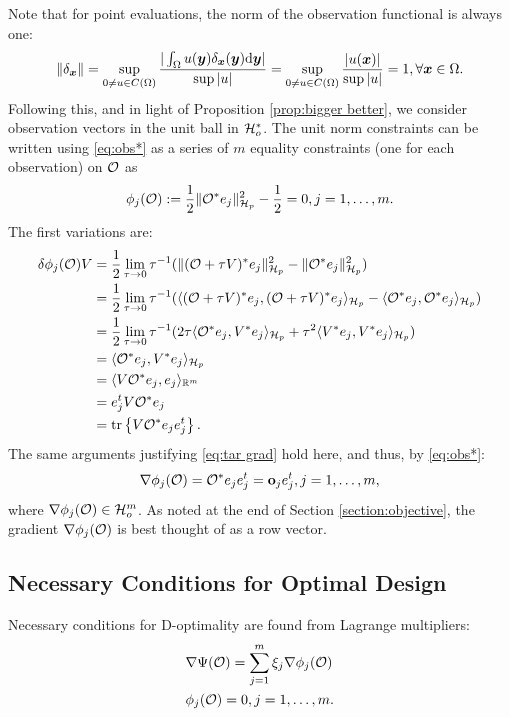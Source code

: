 \documentclass{amsart}
\numberwithin{equation}{section}
\begin{document}
Note that for point evaluations, the norm of the observation
functional is always one:
\begin{align*}
  \| \delta_{{\boldsymbol{x}}} \| = \sup_{0 \neq u \in C(\Omega)} \frac{
    |\int_{\Omega}u({\boldsymbol{y}}) \delta_{{\boldsymbol{x}}}({\boldsymbol{y}}) \text{\textup{d}} {\boldsymbol{y}}| 
  }{
    \sup|u|}
  = \sup_{0 \neq u \in C(\Omega)} \frac{|u({\boldsymbol{x}})|}{ \sup|u|} = 1,
  \forall {\boldsymbol{x}} \in \Omega.
\end{align*}
Following this, and in light of Proposition \ref{prop:bigger better},
we consider observation vectors in the unit ball in $\mathcal{H}_o^*$. The
unit norm constraints can be written using \eqref{eq:obs*} as a series
of $m$ equality constraints (one for each observation) on $\mathcal{O}$ as
\begin{align}\label{eq:constraints}
  \phi_j(\mathcal{O}) :=\frac12 \| \mathcal{O}^* e_j\|_{\mathcal{H}_p}^2 - \frac12 = 0,j=1,\dots,m.
\end{align}
The first variations are:
\begin{align*}
  \delta \phi_j(\mathcal{O})V  
  &= \frac12\lim_{\tau \to 0}\tau^{-1}
  ( \|(\mathcal{O} + \tau V)^*e_j \|_{\mathcal{H}_p}^2 - \|\mathcal{O} ^*e_j \|_{\mathcal{H}_p}^2  ) \\
  &= \frac12\lim_{\tau \to 0}\tau^{-1}
  ( \langle (\mathcal{O} + \tau V)^*e_j, (\mathcal{O} + \tau V)^*e_j \rangle_{\mathcal{H}_p} - 
  \langle \mathcal{O}^*e_j, \mathcal{O}^*e_j \rangle_{\mathcal{H}_p} ) \\
  &= \frac12\lim_{\tau \to 0}\tau^{-1}
  (2\tau \langle \mathcal{O}^*e_j,V^*e_j \rangle_{\mathcal{H}_p} 
  +\tau^2 \langle V^*e_j, V^*e_j \rangle_{\mathcal{H}_p} ) \\
  &= \langle \mathcal{O}^*e_j,V^*e_j \rangle_{\mathcal{H}_p} \\
  &= \langle V \mathcal{O}^*e_j,e_j \rangle_{\mathbb{R}^m} \\
  &= e_j^t V \mathcal{O}^* e_j \\
  &= \textup{tr}\left \{V \mathcal{O}^* e_je_j^t \right \}.
\end{align*}
The same arguments justifying \eqref{eq:tar grad} hold here, and thus, by \eqref{eq:obs*}:
\begin{align}\label{eq:grad constraints}
\nabla \phi_j(\mathcal{O}) = \mathcal{O}^* e_j e_j^t = \mathbf{o}_j e_j^t , j=1,\dots,m,
\end{align}
where $\nabla \phi_j(\mathcal{O}) \in \mathcal{H}_o^m$. As noted at the end of
Section \ref{section:objective}, the gradient $\nabla \phi_j(\mathcal{O})$ is
best thought of as a row vector.

\subsection{Necessary Conditions for Optimal Design}\label{subsec:necessary}
Necessary conditions for D-optimality are found from Lagrange
multipliers:
\begin{align}
  &\nabla \Psi(\mathcal{O}) = \sum_{j=1}^m \xi_j \nabla \phi_j (\mathcal{O})
  \label{eq:Lagrange mult1} \\
    &\phi_j(\mathcal{O}) = 0, j = 1,\dots,m. \label{eq:Lagrange mult2}
\end{align}
\end{document}
